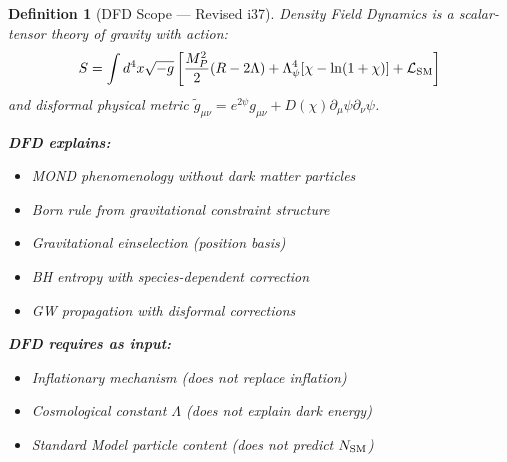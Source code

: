 \documentclass[11pt,a4paper]{article}
\newtheorem{definition}{Definition}
\begin{document}
\begin{definition}[DFD Scope --- Revised i37]
Density Field Dynamics is a scalar-tensor theory of gravity with action:
\begin{equation}
S = \int d^4x\sqrt{-g}\left[\frac{M_P^2}{2}(R - 2\Lambda) + \Lambda_\psi^4[\chi - \ln(1+\chi)] + \mathcal{L}_{\rm SM}\right]
\end{equation}
and disformal physical metric $\tilde{g}_{\mu\nu} = e^{2\psi}g_{\mu\nu} + D(\chi)\partial_\mu\psi\partial_\nu\psi$.

\textbf{DFD explains:}
\begin{itemize}
\item MOND phenomenology without dark matter particles
\item Born rule from gravitational constraint structure
\item Gravitational einselection (position basis)
\item BH entropy with species-dependent correction
\item GW propagation with disformal corrections
\end{itemize}

\textbf{DFD requires as input:}
\begin{itemize}
\item Inflationary mechanism (does not replace inflation)
\item Cosmological constant $\Lambda$ (does not explain dark energy)
\item Standard Model particle content (does not predict $N_{\rm SM}$)
\end{itemize}
\end{definition}
\end{document}

